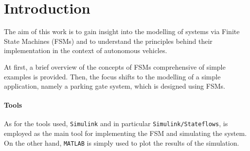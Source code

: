 \section{Introduction}
\label{sec:introduction}

The aim of this work is to gain insight into the modelling of systems via Finite State Machines (FSMs) and to understand the principles behind their implementation in the context of autonomous vehicles.

At first, a brief overview of the concepts of FSMs comprehensive of simple examples is provided.
Then, the focus shifts to the modelling of a simple application, namely a parking gate system, which is designed using FSMs.

\paragraph{Tools}

As for the tools used, \texttt{Simulink} and in particular \texttt{Simulink/Stateflows}, is employed as the main tool for implementing the FSM and simulating the system.
On the other hand, \texttt{MATLAB} is simply used to plot the results of the simulation.